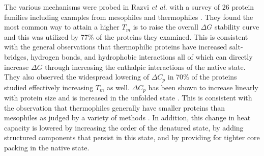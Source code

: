 {The various mechanisms were probed in Razvi \emph{et al.} with a survey of 26
protein families including examples from mesophiles and thermophiles
\cite{razvi2006lst}.  They found the most common way to attain a higher ${T
}_{m }$ is to raise the overall $\Delta G$ stability curve and this was
utilized by 77\% of the proteins they examined.  This is consistent with the
general observations that thermophilic proteins have increased salt-bridges,
hydrogen bonds, and hydrophobic interactions all of which can directly increase
$\Delta G$ through increasing the enthalpic interactions of the native state.
They also observed the widespread lowering of $\Delta  {C }_{p }$ in 70\% of
the proteins studied effectively increasing ${T }_{m }$ as well.  $\Delta {C
}_{p }$ has been shown to increase linearly with protein size and is increased
in the unfolded state \cite{myers1995dmv}. This is consistent with the
observation that thermophiles generally have smaller proteins than mesophiles
as judged by a variety of methods \cite{chakravarty2002efr}.  In addition, this
change in heat capacity is lowered by increasing the order of the denatured
state, by adding structured components that persist in this state, and by
providing for tighter core packing in the native state.



}
